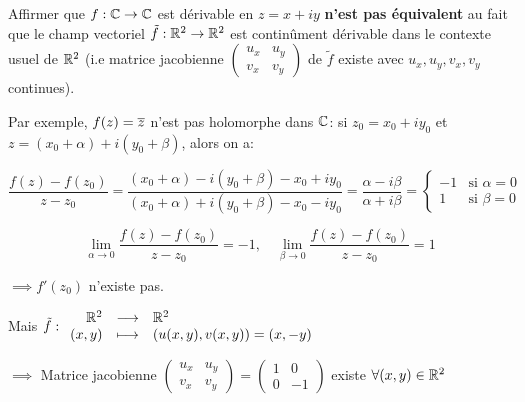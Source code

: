 \begin{remark}[finale]
    Affirmer que $f: \mathbb{C} \rightarrow \mathbb{C}$ est dérivable en $z = x + iy$ \textbf{n'est pas équivalent} au fait que le champ vectoriel $\tilde{f}: \mathbb{R}^2 \rightarrow \mathbb{R}^2$ est continûment dérivable dans le contexte usuel de $\mathbb{R}^2$ (i.e matrice jacobienne $\begin{pmatrix}u_x & u_y\\v_x & v_y\end{pmatrix}$ de $\tilde{f}$ existe avec $u_x, u_y, v_x, v_y$ continues).
    
    Par exemple, $f(z) = \overline{z}$ n'est pas holomorphe dans $\mathbb{C}$: si $z_0 = x_0 + i y_0$ et $z = (x_0 + \alpha) + i (y_0 + \beta)$, alors on a:
    
    \[\frac{f(z) - f(z_0)}{z - z_0} = \frac{(x_0 + \alpha) - i(y_0 + \beta) - x_0 + iy_0}{(x_0 + \alpha) + i(y_0 + \beta) - x_0 - iy_0} = \frac{\alpha - i\beta}{\alpha + i\beta} = \left\{\begin{array}{rl}-1 & \textrm{si } \alpha = 0\\1 & \textrm{si } \beta = 0\end{array}\right.\]
    
    \[\lim\limits_{\alpha \rightarrow 0} \frac{f(z) - f(z_0)}{z - z_0} = -1, \quad \lim\limits_{\beta \rightarrow 0} \frac{f(z) - f(z_0)}{z - z_0} = 1\]
    
    $\implies f'(z_0)$ n'existe pas.
    
    Mais $\tilde{f}:\begin{array}{rcl} \mathbb{R}^2 & \longrightarrow & \mathbb{R}^2\\ (x,y) & \longmapsto & (u(x,y),v(x,y)) = (x,-y)\end{array}$
    
    $\implies$ Matrice jacobienne $\begin{pmatrix}u_x & u_y\\v_x & v_y\end{pmatrix} = \begin{pmatrix}1 & 0\\0 & -1 \end{pmatrix}$ existe $\forall (x,y) \in \mathbb{R}^2$
\end{remark}
